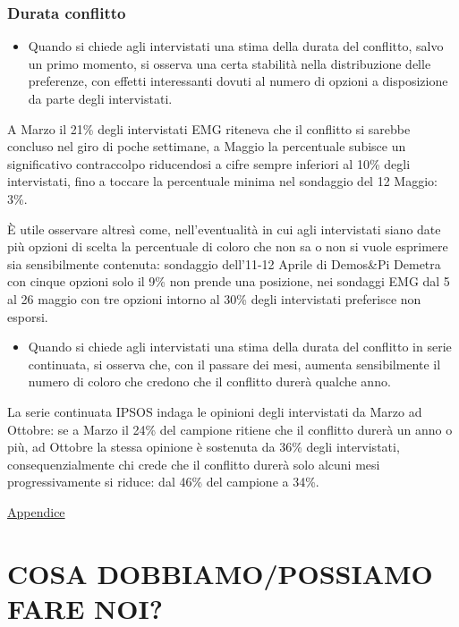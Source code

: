 \documentclass[
]{book}
\providecommand{\tightlist}{%
  \setlength{\itemsep}{0pt}\setlength{\parskip}{0pt}}
\begin{document}
\hypertarget{durata-conflitto}{%
\subsection{Durata conflitto}\label{durata-conflitto}}

\begin{itemize}
\tightlist
\item
  Quando si chiede agli intervistati una stima della durata del conflitto, salvo un primo momento, si osserva una certa stabilità nella distribuzione delle preferenze, con effetti interessanti dovuti al numero di opzioni a disposizione da parte degli intervistati.
\end{itemize}

A Marzo il 21\% degli intervistati EMG riteneva che il conflitto si sarebbe concluso nel giro di poche settimane, a Maggio la percentuale subisce un significativo contraccolpo riducendosi a cifre sempre inferiori al 10\% degli intervistati, fino a toccare la percentuale minima nel sondaggio del 12 Maggio: 3\%.

È utile osservare altresì come, nell'eventualità in cui agli intervistati siano date più opzioni di scelta la percentuale di coloro che non sa o non si vuole esprimere sia sensibilmente contenuta: sondaggio dell'11-12 Aprile di Demos\&Pi Demetra con cinque opzioni solo il 9\% non prende una posizione, nei sondaggi EMG dal 5 al 26 maggio con tre opzioni intorno al 30\% degli intervistati preferisce non esporsi.

\begin{itemize}
\tightlist
\item
  Quando si chiede agli intervistati una stima della durata del conflitto in serie continuata, si osserva che, con il passare dei mesi, aumenta sensibilmente il numero di coloro che credono che il conflitto durerà qualche anno.
\end{itemize}

La serie continuata IPSOS indaga le opinioni degli intervistati da Marzo ad Ottobre: se a Marzo il 24\% del campione ritiene che il conflitto durerà un anno o più, ad Ottobre la stessa opinione è sostenuta da 36\% degli intervistati, consequenzialmente chi crede che il conflitto durerà solo alcuni mesi progressivamente si riduce: dal 46\% del campione a 34\%.

\href{https://github.com/LucianaFazio/Ucrania/blob/main/IV.\%20La\%20guerra\%20e\%20il\%20suo\%20andamento\%20v.4.pdf}{Appendice}

\hypertarget{cosa-dobbiamopossiamo-fare-noi}{%
\chapter{COSA DOBBIAMO/POSSIAMO FARE NOI?}\label{cosa-dobbiamopossiamo-fare-noi}}
\end{document}
